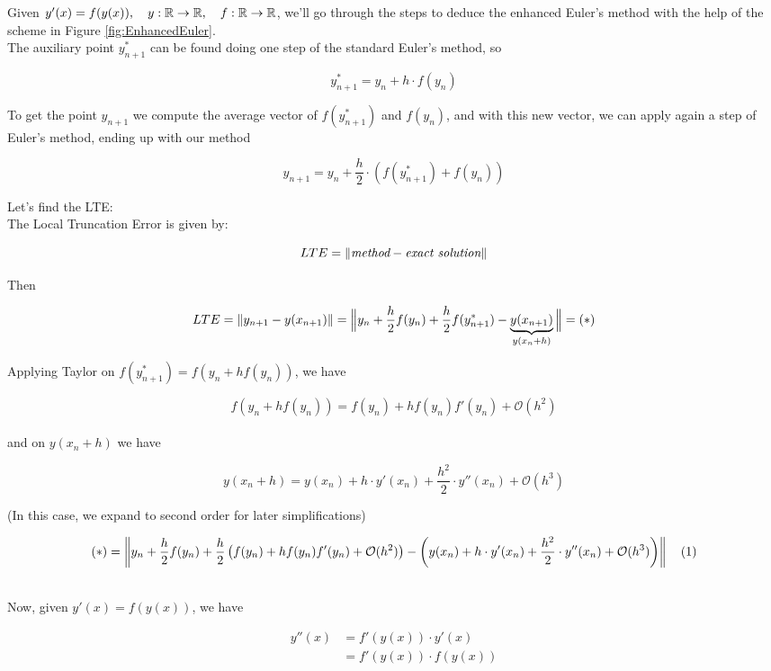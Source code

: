 Given $y'(x) = f(y(x)), \quad y: \mathbb{R} \to \mathbb{R}, \quad f:\mathbb{R} \to \mathbb{R}$, we'll go through the steps to deduce the enhanced Euler's method with the help of the scheme in Figure \ref{fig:EnhancedEuler}. \\

The auxiliary point $y_{n+1}^*$ can be found doing one step of the standard Euler's method, so 

\[
  y_{n+1}^* = y_n + h\cdot f(y_n)
\]
\vspace{0.01cm}

To get the point $y_{n+1}$ we compute the average vector of $f(y_{n+1}^*)$ and $f(y_n)$, and with this new vector, we can apply again a step of Euler's method, ending up with our method

\[
  \boxed{y_{n+1} = y_n + \frac{h}{2}\cdot \left(f(y_{n+1}^*) + f(y_n)\right)}
\]
\newpage

Let's find the LTE: \\

The Local Truncation Error is given by:

\[
  LTE = \left\lVert\textit{method} - \textit{exact solution}\right\rVert
\]

Then

\[
  LTE = \left\lVert y_{n+1} - y(x_{n+1})\right\rVert = \Big\rVert y_n + \frac{h}{2}f(y_n) + \frac{h}{2}f(y_{n+1}^*) - \underbrace{y(x_{n+1})}_{y(x_n + h)}\Big\rVert = (*)
\]

Applying Taylor on $f(y_{n+1}^*) = f\left(y_n + hf(y_n)\right)$, we have

\[
  f\left(y_n + hf(y_n)\right) = f(y_n) + hf(y_n)f'(y_n) + \mathcal{O}(h^2)
\]
\\
and on $y(x_n +h)$ we have

\[
  y(x_n + h) = y(x_n) + h\cdot y'(x_n) + \frac{h^2}{2}\cdot y''(x_n) + \mathcal{O}(h^3)
\]

(In this case, we expand to second order for later simplifications)

\footnotesize

\[
    (*) = \left\lVert y_n + \frac{h}{2}f(y_n) + \frac{h}{2}\left(f(y_n) + hf(y_n)f'(y_n) + \mathcal{O}(h^2) \right) - \left(y(x_n) + h\cdot y'(x_n) + \frac{h^2}{2}\cdot y''(x_n) + \mathcal{O}(h^3) \right)\right\rVert \quad (1)
\]

\normalsize
\-\\
Now, given $y'(x) = f(y(x))$, we have

\vspace{-0.5cm}

\begin{align*}
    y''(x) &= f'(y(x))\cdot y'(x) \\
           &= f'(y(x)) \cdot f(y(x))
\end{align*}

